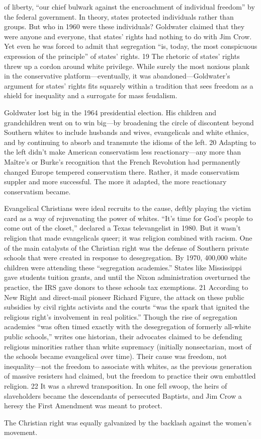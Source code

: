 of liberty, “our chief bulwark against the encroachment of individual freedom” by the federal government. In theory, states protected individuals rather than groups. But who in 1960 were these individuals? Goldwater claimed that they were anyone and everyone, that states’ rights had nothing to do with Jim Crow. Yet even he was forced to admit that segregation “is, today, the most conspicuous expression of the principle” of states’ rights. {\color{blue} 19 } The rhetoric of states’ rights threw up a cordon around white privilege. While surely the most noxious plank in the conservative platform—eventually, it was abandoned—Goldwater’s argument for states’ rights fits squarely within a tradition that sees freedom as a shield for inequality and a surrogate for mass feudalism.{\par} Goldwater lost big in the 1964 presidential election. His children and grandchildren went on to win big—by broadening the circle of discontent beyond Southern whites to include husbands and wives, evangelicals and white ethnics, and by continuing to absorb and transmute the idioms of the left. {\color{blue} 20 } Adapting to the left didn’t make American conservatism less reactionary—any more than Maître’s or Burke’s recognition that the French Revolution had permanently changed Europe tempered conservatism there. Rather, it made conservatism suppler and more successful. The more it adapted, the more reactionary conservatism became.{\par} Evangelical Christians were ideal recruits to the cause, deftly playing the victim card as a way of rejuvenating the power of whites. “It’s time for God’s people to come out of the closet,” declared a Texas televangelist in 1980. But it wasn’t religion that made evangelicals queer; it was religion combined with racism. One of the main catalysts of the Christian right was the defense of Southern private schools that were created in response to desegregation. By 1970, 400,000 white children were attending these “segregation academies.” States like Mississippi gave students tuition grants, and until the Nixon administration overturned the practice, the IRS gave donors to these schools tax exemptions. {\color{blue} 21 } According to New Right and direct-mail pioneer Richard Figure, the attack on these public subsidies by civil rights activists and the courts “was the spark that ignited the religious right’s involvement in real politics.” Though the rise of segregation academies “was often timed exactly with the desegregation of formerly all-white public schools,” writes one historian, their advocates claimed to be defending religious minorities rather than white supremacy (initially nonsectarian, most of the schools became evangelical over time). Their cause was freedom, not inequality—not the freedom to associate with whites, as the previous generation of massive resisters had claimed, but the freedom to practice their own embattled religion. {\color{blue} 22 } It was a shrewd transposition. In one fell swoop, the heirs of slaveholders became the descendants of persecuted Baptists, and Jim Crow a heresy the First Amendment was meant to protect.{\par} The Christian right was equally galvanized by the backlash against the women’s movement. 